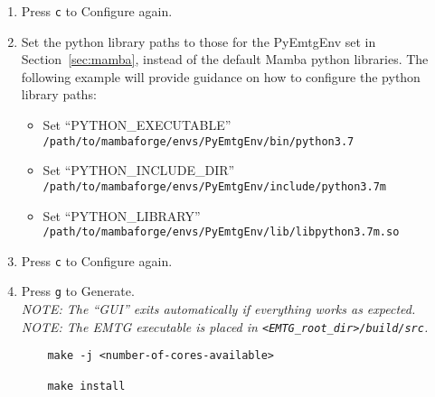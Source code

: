 \begin{enumerate}
	\item Press \texttt{c} to Configure again.
	\item Set the python library paths to those for the PyEmtgEnv set in Section~\ref{sec:mamba}, instead of the default Mamba python libraries. The following example will provide guidance on how to configure the python library paths: 

		\begin{itemize}
			\item Set ``PYTHON\_EXECUTABLE'' \texttt{/path/to/mambaforge/envs/PyEmtgEnv/bin/python3.7}
			\item Set ``PYTHON\_INCLUDE\_DIR'' \texttt{/path/to/mambaforge/envs/PyEmtgEnv/include/python\newline 3.7m}
			\item Set ``PYTHON\_LIBRARY'' \texttt{/path/to/mambaforge/envs/PyEmtgEnv/lib/libpython3.7m.\newline so}
		\end{itemize}
	
	\item Press \texttt{c} to Configure again.
	\item Press \texttt{g} to Generate. \\
	\emph{NOTE: The ``\ac{GUI}'' exits automatically if everything works as expected.} \\
	\emph{NOTE: The \ac{EMTG} executable is placed in \texttt{<EMTG\_root\_dir>/build/src}.}
	
	\begin{verbatim}
	make -j <number-of-cores-available>

	make install
	\end{verbatim}
	
\end{enumerate}

 